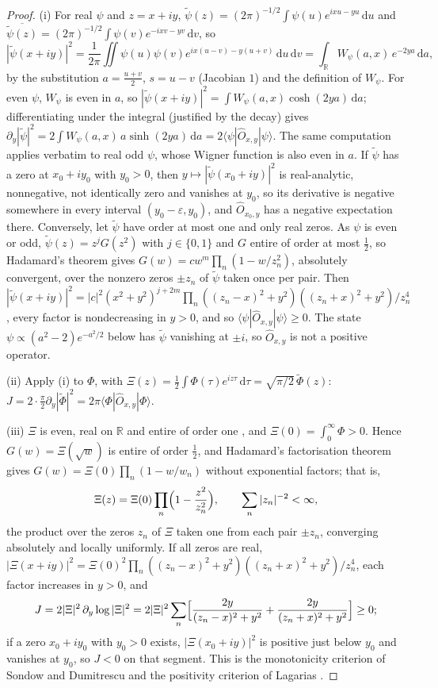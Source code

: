 \documentclass[11pt]{article}
\theoremstyle{definition}\newtheorem{definition}[theorem]{Definition}
\theoremstyle{remark}\newtheorem{remark}[theorem]{Remark}
\newcommand{\R}{\mathbb R}\newcommand{\C}{\mathbb C}\newcommand{\N}{\mathbb N}
\newcommand{\dd}{\,\mathrm d}\newcommand{\e}{\mathrm e}
\begin{document}
\begin{proof}
(i) For real $\psi$ and $z=x+iy$, $\tilde\psi(z)=(2\pi)^{-1/2}\int\psi(u)e^{ixu-yu}\dd u$ and $\overline{\tilde\psi(z)}=(2\pi)^{-1/2}\int\psi(v)e^{-ixv-yv}\dd v$, so
\[
|\tilde\psi(x+iy)|^2=\frac1{2\pi}\iint\psi(u)\psi(v)e^{ix(u-v)-y(u+v)}\dd u\dd v=\int_\R W_\psi(a,x)\,e^{-2ya}\dd a,
\]
by the substitution $a=\frac{u+v}2$, $s=u-v$ (Jacobian $1$) and the definition of $W_\psi$. For even $\psi$, $W_\psi$ is even in $a$, so $|\tilde\psi(x+iy)|^2=\int W_\psi(a,x)\cosh(2ya)\dd a$; differentiating under the integral (justified by the decay) gives $\partial_y|\tilde\psi|^2=2\int W_\psi(a,x)\,a\sinh(2ya)\dd a=2\langle\psi|\hat O_{x,y}|\psi\rangle$. The same computation applies verbatim to real odd $\psi$, whose Wigner function is also even in $a$. If $\tilde\psi$ has a zero at $x_0+iy_0$ with $y_0>0$, then $y\mapsto|\tilde\psi(x_0+iy)|^2$ is real-analytic, nonnegative, not identically zero and vanishes at $y_0$, so its derivative is negative somewhere in every interval $(y_0-\varepsilon,y_0)$, and $\hat O_{x_0,y}$ has a negative expectation there. Conversely, let $\tilde\psi$ have order at most one and only real zeros. As $\psi$ is even or odd, $\tilde\psi(z)=z^jG(z^2)$ with $j\in\{0,1\}$ and $G$ entire of order at most $\frac12$, so Hadamard's theorem gives $G(w)=cw^m\prod_n(1-w/z_n^2)$, absolutely convergent, over the nonzero zeros $\pm z_n$ of $\tilde\psi$ taken once per pair. Then $|\tilde\psi(x+iy)|^2=|c|^2(x^2+y^2)^{j+2m}\prod_n((z_n-x)^2+y^2)((z_n+x)^2+y^2)/z_n^4$, every factor is nondecreasing in $y>0$, and so $\langle\psi|\hat O_{x,y}|\psi\rangle\ge0$. The state $\psi\propto(a^2-2)e^{-a^2/2}$ below has $\tilde\psi$ vanishing at $\pm i$, so $\hat O_{x,y}$ is not a positive operator.

(ii) Apply (i) to $\Phi$, with $\Xi(z)=\frac12\int\Phi(\tau)e^{iz\tau}\dd\tau=\sqrt{\pi/2}\,\tilde\Phi(z)$: $J=2\cdot\frac\pi2\partial_y|\tilde\Phi|^2=2\pi\langle\Phi|\hat O_{x,y}|\Phi\rangle$.

(iii) $\Xi$ is even, real on $\R$ and entire of order one \cite[\S2.12]{Titchmarsh}, and $\Xi(0)=\int_0^\infty\Phi>0$. Hence $G(w)=\Xi(\sqrt w)$ is entire of order $\frac12$, and Hadamard's factorisation theorem gives $G(w)=\Xi(0)\prod_n(1-w/w_n)$ without exponential factors; that is,
\begin{equation}\label{eq:hadamard}
\Xi(z)=\Xi(0)\prod_n\Bigl(1-\frac{z^2}{z_n^2}\Bigr),\qquad\sum_n|z_n|^{-2}<\infty,
\end{equation}
the product over the zeros $z_n$ of $\Xi$ taken one from each pair $\pm z_n$, converging absolutely and locally uniformly. If all zeros are real, $|\Xi(x+iy)|^2=\Xi(0)^2\prod_n((z_n-x)^2+y^2)((z_n+x)^2+y^2)/z_n^4$, each factor increases in $y>0$, and
\[
J=2|\Xi|^2\,\partial_y\log|\Xi|^2=2|\Xi|^2\sum_n\Bigl[\frac{2y}{(z_n-x)^2+y^2}+\frac{2y}{(z_n+x)^2+y^2}\Bigr]\ge0;
\]
if a zero $x_0+iy_0$ with $y_0>0$ exists, $|\Xi(x_0+iy)|^2$ is positive just below $y_0$ and vanishes at $y_0$, so $J<0$ on that segment. This is the monotonicity criterion of Sondow and Dumitrescu \cite{SD} and the positivity criterion of Lagarias \cite{Lagarias}.


\end{proof}
\end{document}
